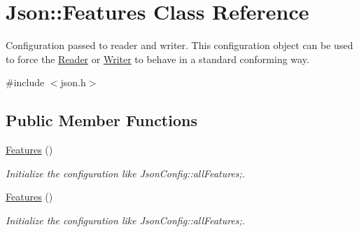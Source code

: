 \hypertarget{class_json_1_1_features}{}\section{Json\+:\+:Features Class Reference}
\label{class_json_1_1_features}


Configuration passed to reader and writer. This configuration object can be used to force the \hyperlink{class_json_1_1_reader}{Reader} or \hyperlink{class_json_1_1_writer}{Writer} to behave in a standard conforming way.  




{\ttfamily \#include $<$json.\+h$>$}

\subsection*{Public Member Functions}
\begin{DoxyCompactItemize}
\item 
\hyperlink{class_json_1_1_features_ad15a091cb61bb31323299a95970d2644}{Features} ()
\begin{DoxyCompactList}\small\item\em Initialize the configuration like Json\+Config\+::all\+Features;. \end{DoxyCompactList}\item 
\hyperlink{class_json_1_1_features_ad15a091cb61bb31323299a95970d2644}{Features} ()
\begin{DoxyCompactList}\small\item\em Initialize the configuration like Json\+Config\+::all\+Features;. \end{DoxyCompactList}\end{DoxyCompactItemize}

